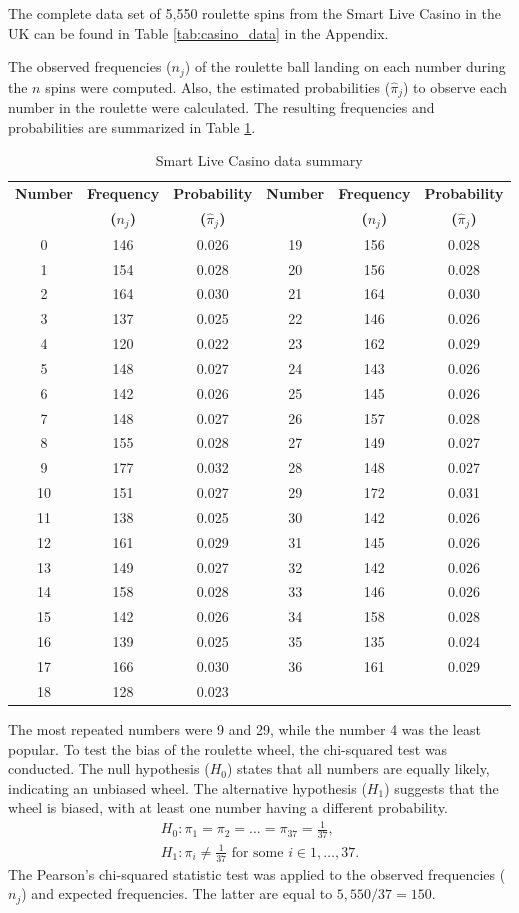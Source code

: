 \documentclass[11pt,twoside]{article}
\numberwithin{Theorem}{section}
\numberwithin{Definition}{section}
\numberwithin{Lemma}{section}
\numberwithin{Algorithm}{section}
\numberwithin{equation}{section}
\begin{document}
The complete data set of 5,550 roulette spins from the Smart Live Casino in the UK can be found in Table \ref{tab:casino_data} in the Appendix.

The observed frequencies ($n_{j}$) of the roulette ball landing on each number during the $n$ spins were computed. Also, the estimated probabilities ($\hat\pi_{j}$) to observe each number in the roulette were calculated. The resulting frequencies and probabilities are summarized in Table \ref{tab:freq_prob}.

\begin{table}[htbp]
  \centering
  \caption{Smart Live Casino data summary}
  \label{tab:freq_prob}
  \begin{tabular}{|ccc||ccc|}
    \hline
    \textbf{Number} & \textbf{Frequency} & \textbf{Probability} & \textbf{Number} & \textbf{Frequency} & \textbf{Probability} \\
         & \textbf{($n_{j}$)} & \textbf{($\hat\pi_{j}$)} &  & \textbf{($n_{j}$)} & \textbf{($\hat\pi_{j}$)} \\
    \hline
0&146&0.026&19&156&0.028\\
1&154&0.028&20&156&0.028\\
2&164&0.030&21&164&0.030\\
3&137&0.025&22&146&0.026\\
4&120&0.022&23&162&0.029\\
5&148&0.027&24&143&0.026\\
6&142&0.026&25&145&0.026\\
7&148&0.027&26&157&0.028\\
8&155&0.028&27&149&0.027\\
9&177&0.032&28&148&0.027\\
10&151&0.027&29&172&0.031\\
11&138&0.025&30&142&0.026\\
12&161&0.029&31&145&0.026\\
13&149&0.027&32&142&0.026\\
14&158&0.028&33&146&0.026\\
15&142&0.026&34&158&0.028\\
16&139&0.025&35&135&0.024\\
17&166&0.030&36&161&0.029\\
18&128&0.023&&&\\
\hline
  \end{tabular}
\end{table}

The most repeated numbers were 9 and 29, while the number 4 was the least popular. To test the bias of the roulette wheel, the chi-squared test was conducted. The null hypothesis ($H_{0}$) states that all numbers are equally likely, indicating an unbiased wheel. The alternative hypothesis ($H_{1}$) suggests that the wheel is biased, with at least one number having a different probability.
\begin{align*}
H_{0}: \pi_{1}= \pi_{2}= \ldots = \pi_{37} = \frac{1}{37},\\
H_{1}: \pi_{i} \neq \frac{1}{37} \text{ for some }i \in {1, \ldots, 37}.
\end{align*}
The Pearson's chi-squared statistic test was applied to the observed frequencies ($n_{j}$) and expected frequencies. The latter are equal to $5,550/37 = 150$.
\end{document}
